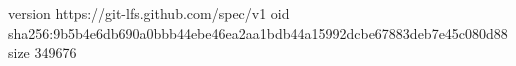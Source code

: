 version https://git-lfs.github.com/spec/v1
oid sha256:9b5b4e6db690a0bbb44ebe46ea2aa1bdb44a15992dcbe67883deb7e45c080d88
size 349676

